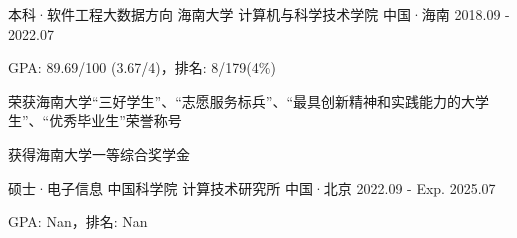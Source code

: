 

\begin{cventries}

    \cventry
    {本科·软件工程大数据方向} %
    {海南大学 计算机与科学技术学院} %
    {中国·海南} %
    {2018.09 - 2022.07} %
    {
        \begin{cvitems} %
            \item {GPA: 89.69/100 (3.67/4)，排名: 8/179(4\%)}
            \item {荣获海南大学“三好学生”、“志愿服务标兵”、“最具创新精神和实践能力的大学生”、“优秀毕业生”荣誉称号}
            \item {获得海南大学一等综合奖学金}
        \end{cvitems}
    }
    
    \cventry
    {硕士·电子信息} %
    {中国科学院 计算技术研究所} %
    {中国·北京} %
    {2022.09 - Exp. 2025.07} %
    {
        \begin{cvitems} %
            \item {GPA: Nan，排名: Nan}
        \end{cvitems}
    }

\end{cventries}
